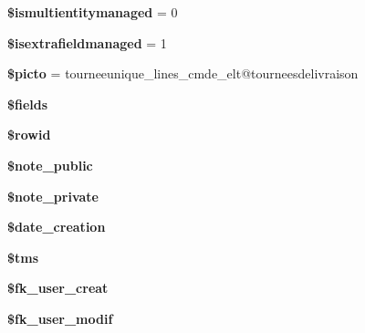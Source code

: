\begin{DoxyCompactItemize}
\mbox{\label{classTourneeUnique__lines__cmde__elt_ae2d3d74b270ae71ed95e2d65559791f9}} 
{\bfseries \$ismultientitymanaged} = 0
\item 
\mbox{\label{classTourneeUnique__lines__cmde__elt_a248b4e44110431aa0dc0476dce373da1}} 
{\bfseries \$isextrafieldmanaged} = 1
\item 
\mbox{\label{classTourneeUnique__lines__cmde__elt_abc59879eee55cc4e6b53a1a33b86e419}} 
{\bfseries \$picto} = \textquotesingle{}tourneeunique\+\_\+lines\+\_\+cmde\+\_\+elt@tourneesdelivraison\textquotesingle{}
\item 
{\bfseries \$fields}
\item 
\mbox{\label{classTourneeUnique__lines__cmde__elt_a0d4d39c99be73cb9e681a656db6a8923}} 
{\bfseries \$rowid}
\item 
\mbox{\label{classTourneeUnique__lines__cmde__elt_a3cba4ebe2dab606c67ee04bbda8ccfc0}} 
{\bfseries \$note\+\_\+public}
\item 
\mbox{\label{classTourneeUnique__lines__cmde__elt_a604a2853df492753f74db88031838455}} 
{\bfseries \$note\+\_\+private}
\item 
\mbox{\label{classTourneeUnique__lines__cmde__elt_adea8bea723d2d5985bd07046cf6aa8f3}} 
{\bfseries \$date\+\_\+creation}
\item 
\mbox{\label{classTourneeUnique__lines__cmde__elt_abe2084a79523618fc442fa7b746c119f}} 
{\bfseries \$tms}
\item 
\mbox{\label{classTourneeUnique__lines__cmde__elt_a0c4605eb5a642946cbd45b38ef16c99f}} 
{\bfseries \$fk\+\_\+user\+\_\+creat}
\item 
\mbox{\label{classTourneeUnique__lines__cmde__elt_ac21a8f8f8f31461fb8a8399120fca29b}} 
{\bfseries \$fk\+\_\+user\+\_\+modif}

\end{DoxyCompactItemize}
